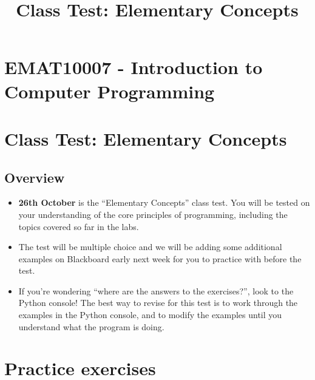 \documentclass[11pt]{report}
\begin{document}
\title{Class Test: Elementary Concepts}
\section*{EMAT10007 - Introduction to Computer Programming}
\section*{Class Test: Elementary Concepts}
\subsection*{Overview}
\begin{itemize}
    \item \textbf{26th October} is the ``Elementary Concepts'' class test. You will be tested on your understanding of the core principles of programming, including the topics covered so far in the labs.

	\item The test will be multiple choice and we will be adding some additional examples on Blackboard early next week for you to practice with before the test.

    \item If you're wondering ``where are the answers to the exercises?'', look to the Python console! The best way to revise for this test is to work through the examples in the Python console, and to modify the examples until you understand what the program is doing.
\end{itemize}

\section*{Practice exercises}
\end{document}
